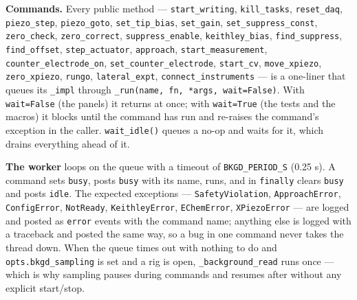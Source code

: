 \textbf{Commands.} Every public method --- \texttt{start\_\discretionary{}{}{}writing}, \texttt{kill\_\discretionary{}{}{}tasks}, \texttt{reset\_\discretionary{}{}{}daq}, \texttt{piezo\_\discretionary{}{}{}step}, \texttt{piezo\_\discretionary{}{}{}goto}, \texttt{set\_\discretionary{}{}{}tip\_\discretionary{}{}{}bias}, \texttt{set\_\discretionary{}{}{}gain}, \texttt{set\_\discretionary{}{}{}suppress\_\discretionary{}{}{}const}, \texttt{zero\_\discretionary{}{}{}check}, \texttt{zero\_\discretionary{}{}{}correct}, \texttt{suppress\_\discretionary{}{}{}enable}, \texttt{keithley\_\discretionary{}{}{}bias}, \texttt{find\_\discretionary{}{}{}suppress}, \texttt{find\_\discretionary{}{}{}offset}, \texttt{step\_\discretionary{}{}{}actuator}, \texttt{approach}, \texttt{start\_\discretionary{}{}{}measurement}, \texttt{counter\_\discretionary{}{}{}electrode\_\discretionary{}{}{}on}, \texttt{set\_\discretionary{}{}{}counter\_\discretionary{}{}{}electrode}, \texttt{start\_\discretionary{}{}{}cv}, \texttt{move\_\discretionary{}{}{}xpiezo}, \texttt{zero\_\discretionary{}{}{}xpiezo}, \texttt{rungo}, \texttt{lateral\_\discretionary{}{}{}expt}, \texttt{connect\_\discretionary{}{}{}instruments} --- is a one-liner that queues its \texttt{\_\discretionary{}{}{}impl} through \texttt{\_\discretionary{}{}{}run(name,\discretionary{}{}{} fn,\discretionary{}{}{} *args,\discretionary{}{}{} wait=False)}. With \texttt{wait=False} (the panels) it returns at once; with \texttt{wait=True} (the tests and the macros) it blocks until the command has run and re-raises the command's exception in the caller. \texttt{wait\_\discretionary{}{}{}idle()} queues a no-op and waits for it, which drains everything ahead of it.

\textbf{The worker} loops on the queue with a timeout of \texttt{BKGD\_\discretionary{}{}{}PERIOD\_\discretionary{}{}{}S} (0.25 s). A command sets \texttt{busy}, posts \texttt{busy} with its name, runs, and in \texttt{finally} clears \texttt{busy} and posts \texttt{idle}. The expected exceptions --- \texttt{Safety\discretionary{}{}{}Violation}, \texttt{Approach\discretionary{}{}{}Error}, \texttt{Config\discretionary{}{}{}Error}, \texttt{Not\discretionary{}{}{}Ready}, \texttt{Keithley\discretionary{}{}{}Error}, \texttt{EChem\discretionary{}{}{}Error}, \texttt{XPiezo\discretionary{}{}{}Error} --- are logged and posted as \texttt{error} events with the command name; anything else is logged with a traceback and posted the same way, so a bug in one command never takes the thread down. When the queue times out with nothing to do and \texttt{opts.\discretionary{}{}{}bkgd\_\discretionary{}{}{}sampling} is set and a rig is open, \texttt{\_\discretionary{}{}{}background\_\discretionary{}{}{}read} runs once --- which is why sampling pauses during commands and resumes after without any explicit start/stop.

